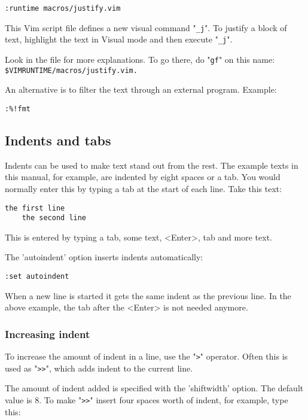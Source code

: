 \begin{Verbatim}[samepage=true]
 :runtime macros/justify.vim
\end{Verbatim}

This Vim script file defines a new visual command "\verb!_j!".
To justify a block of text, highlight the text in Visual mode and then execute "\verb!_j!".

Look in the file for more explanations.
To go there, do "\verb!gf!" on this name: \verb!$VIMRUNTIME/macros/justify.vim.!

An alternative is to filter the text through an external program.
Example:

\begin{Verbatim}[samepage=true]
 :%!fmt
\end{Verbatim}
\subsection{Indents and tabs}
\label{Indents and tabs}
Indents can be used to make text stand out from the rest.  The example texts
in this manual, for example, are indented by eight spaces or a tab.  You would
normally enter this by typing a tab at the start of each line.  Take this
text:

\begin{Verbatim}[samepage=true]
    the first line 
    the second line 
\end{Verbatim}

This is entered by typing a tab, some text, <Enter>, tab and more text.

The 'autoindent' option inserts indents automatically:

\begin{Verbatim}[samepage=true]
 :set autoindent
\end{Verbatim}

When a new line is started it gets the same indent as the previous line.
In the above example, the tab after the <Enter> is not needed anymore.

\subsubsection{Increasing indent}
To increase the amount of indent in a line, use the "\verb!>!" operator.
Often this is used as "\verb!>>!", which adds indent to the current line.

The amount of indent added is specified with the 'shiftwidth' option.
The default value is 8.
To make "\verb!>>!" insert four spaces worth of indent, for example, type this:

